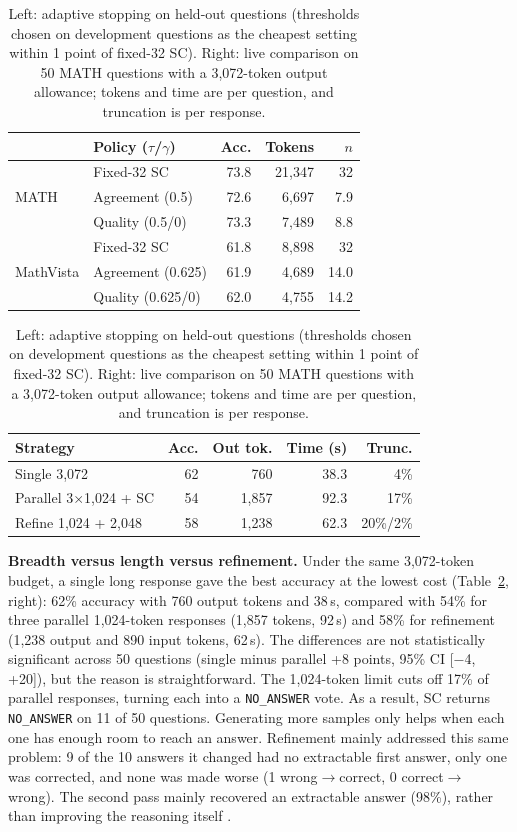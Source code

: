 \documentclass{article}
\begin{document}
\begin{table}[t]
\caption{Left: adaptive stopping on held-out questions (thresholds chosen on development questions as the cheapest
setting within 1 point of fixed-32 SC). Right: live comparison on 50 MATH questions with a 3,072-token output allowance;
tokens and time are per question, and truncation is per response.}
\label{tab:t3adaptive}
\centering
\footnotesize
\begin{tabular}{llrrr}
\toprule
 & Policy ($\tau$/$\gamma$) & Acc. & Tokens & $n$ \\
\midrule
\multirow{3}{*}{MATH} & Fixed-32 SC & 73.8 & 21,347 & 32 \\
 & Agreement (0.5) & 72.6 & 6,697 & 7.9 \\
 & Quality (0.5/0) & 73.3 & 7,489 & 8.8 \\
\midrule
\multirow{3}{*}{MathVista} & Fixed-32 SC & 61.8 & 8,898 & 32 \\
 & Agreement (0.625) & 61.9 & 4,689 & 14.0 \\
 & Quality (0.625/0) & 62.0 & 4,755 & 14.2 \\
\bottomrule
\end{tabular}
\hfill
\begin{tabular}{lrrrr}
\toprule
Strategy & Acc. & Out tok. & Time (s) & Trunc. \\
\midrule
Single 3,072 & 62 & 760 & 38.3 & 4\% \\
Parallel 3$\times$1,024 + SC & 54 & 1,857 & 92.3 & 17\% \\
Refine 1,024 + 2,048 & 58 & 1,238 & 62.3 & 20\%/2\% \\
\bottomrule
\end{tabular}
\end{table}


\textbf{Breadth versus length versus refinement.} Under the same 3,072-token budget, a single long response gave the best accuracy at the lowest cost (Table~\ref{tab:t3adaptive}, right): 62\% accuracy with 760 output tokens and 38\,s, compared with 54\% for three parallel 1,024-token responses (1,857 tokens, 92\,s) and 58\% for refinement (1,238 output and 890 input tokens, 62\,s). The differences are not statistically significant across 50 questions (single minus parallel +8 points, 95\% CI [$-$4, +20]), but the reason is straightforward. The 1,024-token limit cuts off 17\% of parallel responses, turning each into a \texttt{NO\_ANSWER} vote. As a result, SC returns \texttt{NO\_ANSWER} on 11 of 50 questions. Generating more samples only helps when each one has enough room to reach an answer. Refinement mainly addressed this same problem: 9 of the 10 answers it changed had no extractable first answer, only one was corrected, and none was made worse (1 wrong$\to$correct, 0 correct$\to$wrong). The second pass mainly recovered an extractable answer (98\%), rather than improving the reasoning itself \citep{selfrefine}.
\end{document}
